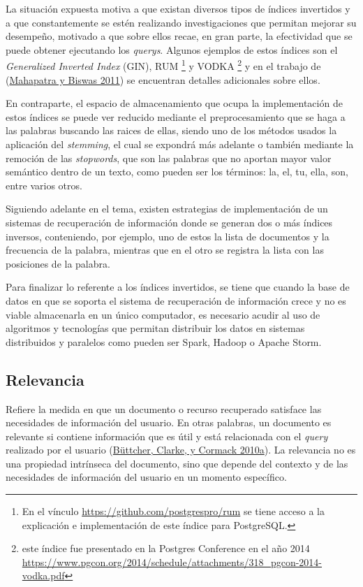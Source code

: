 \documentclass[
  12pt,
  openany]{book}
\begin{document}
La situación expuesta motiva a que existan diversos tipos de índices invertidos y a que constantemente se estén realizando investigaciones que permitan mejorar su desempeño, motivado a que sobre ellos recae, en gran parte, la efectividad que se puede obtener ejecutando los \emph{querys}. Algunos ejemplos de estos índices son el \emph{Generalized Inverted Index} (GIN), RUM \footnote{En el vínculo \url{https://github.com/postgrespro/rum} se tiene acceso a la explicación e implementación de este índice para PostgreSQL.} y VODKA \footnote{este índice fue presentado en la Postgres Conference en el año 2014 \url{https://www.pgcon.org/2014/schedule/attachments/318_pgcon-2014-vodka.pdf}} y en el trabajo de (\protect\hyperlink{ref-Mahapatra2011}{Mahapatra y Biswas 2011}) se encuentran detalles adicionales sobre ellos.

En contraparte, el espacio de almacenamiento que ocupa la implementación de estos índices se puede ver reducido mediante el preprocesamiento que se haga a las palabras buscando las raices de ellas, siendo uno de los métodos usados la aplicación del \emph{stemming}, el cual se expondrá más adelante o también mediante la remoción de las \emph{stopwords}, que son las palabras que no aportan mayor valor semántico dentro de un texto, como pueden ser los términos: la, el, tu, ella, son, entre varios otros.

Siguiendo adelante en el tema, existen estrategias de implementación de un sistemas de recuperación de información donde se generan dos o más índices inversos, conteniendo, por ejemplo, uno de estos la lista de documentos y la frecuencia de la palabra, mientras que en el otro se registra la lista con las posiciones de la palabra.

Para finalizar lo referente a los índices invertidos, se tiene que cuando la base de datos en que se soporta el sistema de recuperación de información crece y no es viable almacenarla en un único computador, es necesario acudir al uso de algoritmos y tecnologías que permitan distribuir los datos en sistemas distribuidos y paralelos como pueden ser Spark, Hadoop o Apache Storm.

\hypertarget{relevancia}{%
\subsection{Relevancia}\label{relevancia}}

Refiere la medida en que un documento o recurso recuperado satisface las necesidades de información del usuario. En otras palabras, un documento es relevante si contiene información que es útil y está relacionada con el \emph{query} realizado por el usuario (\protect\hyperlink{ref-buxfcttcher2010a}{Büttcher, Clarke, y Cormack 2010a}). La relevancia no es una propiedad intrínseca del documento, sino que depende del contexto y de las necesidades de información del usuario en un momento específico.
\end{document}
